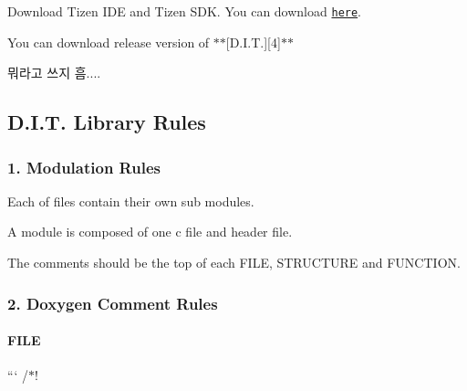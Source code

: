 \begin{DoxyEnumerate}
\item Download Tizen I\-D\-E and Tizen S\-D\-K. You can download \href{https://developer.tizen.org/development/tools/download}{\tt here}.
\item You can download release version of $\ast$$\ast$\mbox{[}D.\-I.\-T.\mbox{]}\mbox{[}4\mbox{]}$\ast$$\ast$
\item 뭐라고 쓰지 흠....
\end{DoxyEnumerate}

\subsection*{D.\-I.\-T. Library Rules}

\subsubsection*{1. Modulation Rules}


\begin{DoxyItemize}
\item Each of files contain their own sub modules.
\item A module is composed of one c file and header file.
\item The comments should be the top of each F\-I\-L\-E, S\-T\-R\-U\-C\-T\-U\-R\-E and F\-U\-N\-C\-T\-I\-O\-N.
\end{DoxyItemize}

\subsubsection*{2. Doxygen Comment Rules}

\paragraph*{F\-I\-L\-E}

``` /$\ast$! 